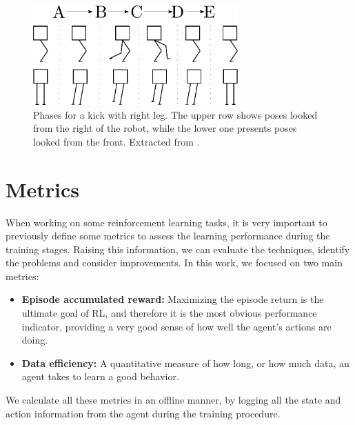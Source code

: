 \begin{figure}[H]
    \centering
    \includegraphics[width=0.7\textwidth]{Chapter5/kicking_phases.pdf} 
    \caption{Phases for a kick with right leg. The upper row shows poses looked from the right of the robot, while the lower one presents poses looked from the front. Extracted from \cite{MestradoManga}.}
    \label{fig:kicking_phases}
\end{figure}


\section{Metrics}

When working on some reinforcement learning tasks, it is very important to previously define some metrics to assess the learning performance during the training stages. Raising this information, we can evaluate the techniques, identify the problems and consider improvements. In this work, we focused on two main metrics:

\begin{itemize}
\item \textbf{Episode accumulated reward:} Maximizing the episode return is the ultimate goal of RL, and therefore it is the most obvious performance indicator, providing a very good sense of how well the agent's actions are doing.

\item \textbf{Data efficiency:} A quantitative measure of how long, or how much data, an agent takes to learn a good behavior.
\end{itemize}

We calculate all these metrics in an offline manner, by logging all the state and action information from the agent during the training procedure.


